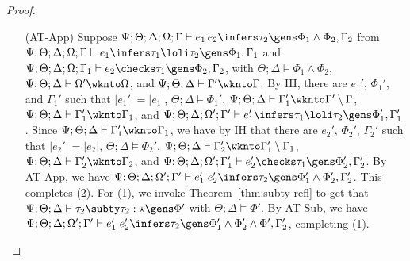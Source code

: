\begin{proof}
\begin{itemize}
  \item[(AT-App)] Suppose $\Psi ; \Theta ; \Delta ; \Omega ; \Gamma\vdash e_1 \, e_2 \infers  \tau_2 \gens \Phi_1 \wedge \Phi_2, \Gamma_2$ from
  $\Psi ; \Theta ; \Delta ; \Omega ; \Gamma\vdash e_1 \infers \tau_1 \loli \tau_2 \gens \Phi_1, \Gamma_1$ and
  $\Psi ; \Theta ; \Delta ; \Omega ; \Gamma_1\vdash e_2 \checks \tau_1 \gens \Phi_2, \Gamma_2$, with
  $\Theta ; \Delta \vDash \Phi_1 \wedge \Phi_2$,
  $\Psi ; \Theta ; \Delta \vdash \Omega' \wknto \Omega$, and
  $\Psi ; \Theta ; \Delta \vdash \Gamma' \wknto \Gamma$.
  By IH, there are $e_1'$, $\Phi_1'$, and $\Gamma_1'$ such that
  $|e_1'| = |e_1|$,
  $\Theta ; \Delta \vDash \Phi_1'$,
  $\Psi ; \Theta ; \Delta \vdash \Gamma_1' \wknto \Gamma' \setminus \Gamma$,
  $\Psi ; \Theta ; \Delta \vdash \Gamma_1' \wknto \Gamma_1$, and
  $\Psi ; \Theta ; \Delta ; \Omega' ; \Gamma' \vdash e_1' \infers \tau_1 \loli \tau_2 \gens \Phi_1',\Gamma_1'$.
  Since $\Psi ; \Theta ; \Delta \vdash \Gamma_1' \wknto \Gamma_1$,
  we have by IH that there are $e_2'$, $\Phi_2'$, $\Gamma_2'$ such that
  $|e_2'| = |e_2|$,
  $\Theta ; \Delta \vDash \Phi_2'$,
  $\Psi ; \Theta ; \Delta \vdash \Gamma_2' \wknto \Gamma_1' \setminus \Gamma_1$,
  $\Psi ; \Theta ; \Delta \vdash \Gamma_2' \wknto \Gamma_2$, and
  $\Psi ; \Theta ; \Delta ; \Omega' ; \Gamma_1' \vdash e_2' \checks \tau_1 \gens \Phi_2',\Gamma_2'$.
  By AT-App, we have
  $\Psi ; \Theta ; \Delta ; \Omega' ; \Gamma' \vdash e_1' \; e_2' \infers \tau_2 \gens \Phi_1' \wedge \Phi_2', \Gamma_2'$.
  This completes (2). For (1), we invoke Theorem~\ref{thm:subty-refl} to get that $\Psi ; \Theta ; \Delta \vdash \tau_2 \subty \tau_2 : \star \gens \Phi'$ with
  $\Theta ; \Delta \vDash \Phi'$. By AT-Sub, we have $\Psi ; \Theta ; \Delta ; \Omega' ; \Gamma' \vdash e_1' \; e_2' \infers \tau_2 \gens \Phi_1' \wedge \Phi_2' \wedge \Phi', \Gamma_2'$, completing (1).
  

\end{itemize}
\end{proof}
